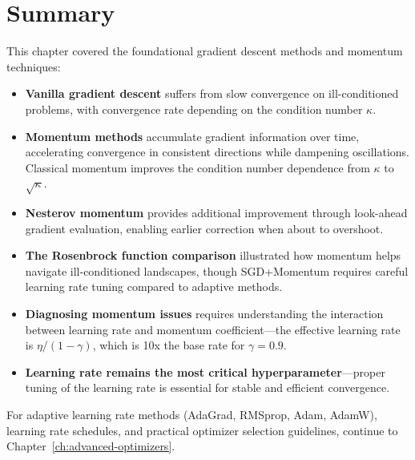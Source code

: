 \documentclass[../../main.tex]{subfiles}
\begin{document}
\section{Summary}
\label{sec:ch11-summary}

This chapter covered the foundational gradient descent methods and momentum techniques:

\begin{itemize}
    \item \textbf{Vanilla gradient descent} suffers from slow convergence on ill-conditioned problems, with convergence rate depending on the condition number $\kappa$.

    \item \textbf{Momentum methods} accumulate gradient information over time, accelerating convergence in consistent directions while dampening oscillations. Classical momentum improves the condition number dependence from $\kappa$ to $\sqrt{\kappa}$.

    \item \textbf{Nesterov momentum} provides additional improvement through look-ahead gradient evaluation, enabling earlier correction when about to overshoot.

    \item \textbf{The Rosenbrock function comparison} illustrated how momentum helps navigate ill-conditioned landscapes, though SGD+Momentum requires careful learning rate tuning compared to adaptive methods.

    \item \textbf{Diagnosing momentum issues} requires understanding the interaction between learning rate and momentum coefficient---the effective learning rate is $\eta/(1-\gamma)$, which is 10x the base rate for $\gamma=0.9$.

    \item \textbf{Learning rate remains the most critical hyperparameter}---proper tuning of the learning rate is essential for stable and efficient convergence.
\end{itemize}

For adaptive learning rate methods (AdaGrad, RMSprop, Adam, AdamW), learning rate schedules, and practical optimizer selection guidelines, continue to Chapter~\ref{ch:advanced-optimizers}.
\end{document}
